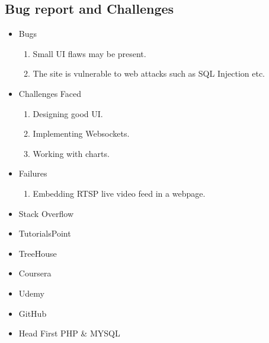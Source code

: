\documentclass[a4paper,12pt,oneside]{book}
\begin{document}
\begin{enumerate}
\section{Bug report and Challenges}
\begin{itemize}
\item{Bugs}
\begin{enumerate}
    \item{Small UI flaws may be present.}
    \item{The site is vulnerable to web attacks such as SQL Injection etc.}
\end{enumerate}
\item{Challenges Faced}
\begin{enumerate}
    \item{Designing good UI.}
    \item{Implementing Websockets.}
    \item{Working with charts.}
\end{enumerate}
\item{Failures}
\begin{enumerate}
    \item{Embedding RTSP live video feed in a webpage.}
\end{enumerate}
    
    
\end{itemize}
\end{enumerate}


\begin{thebibliography}
\begin{itemize}
    \item{Stack Overflow}
    \item{TutorialsPoint}
    \item{TreeHouse}
    \item{Coursera}
    \item{Udemy}
    \item{GitHub}
    \item{Head First PHP \& MYSQL}
\end{itemize}

\end{thebibliography}
\end{document}

